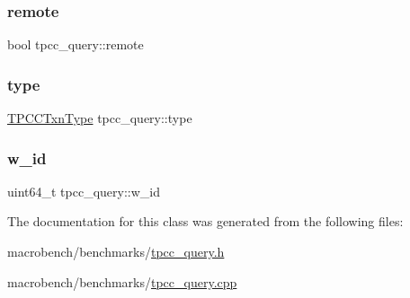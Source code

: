 \mbox{\label{classtpcc__query_a607efc09bb9d8423e09b1cc6c800c430}} 
\subsubsection{\texorpdfstring{remote}{remote}}
{\footnotesize\ttfamily bool tpcc\+\_\+query\+::remote}

\mbox{\label{classtpcc__query_a5f12b36e59fbe8ec727e77e83ae19bd4}} 
\subsubsection{\texorpdfstring{type}{type}}
{\footnotesize\ttfamily \hyperlink{config_8h_acfc6509f2c72fc43d7232487bc453a46}{T\+P\+C\+C\+Txn\+Type} tpcc\+\_\+query\+::type}

\mbox{\label{classtpcc__query_aa0e97757f059338ccc7a278cae867e2d}} 
\subsubsection{\texorpdfstring{w\+\_\+id}{w\_id}}
{\footnotesize\ttfamily uint64\+\_\+t tpcc\+\_\+query\+::w\+\_\+id}



The documentation for this class was generated from the following files\+:\begin{DoxyCompactItemize}
\item 
macrobench/benchmarks/\hyperlink{tpcc__query_8h}{tpcc\+\_\+query.\+h}\item 
macrobench/benchmarks/\hyperlink{tpcc__query_8cpp}{tpcc\+\_\+query.\+cpp}\end{DoxyCompactItemize}
